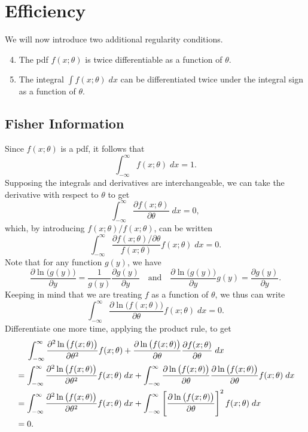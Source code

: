 \documentclass[12pt]{article}
\theoremstyle{definition}
\begin{document}
\section{Efficiency}

 We will now introduce two additional regularity conditions.
\begin{enumerate}[label=\textbf{(R\arabic*)}]
\setcounter{enumi}{3}
	\item The pdf $f(x;\theta)$ is twice differentiable as a function of $\theta$.
	\item The integral $\int f(x;\theta)\; dx$ can be differentiated twice under the integral sign as a function of $\theta$. 
\end{enumerate}
 



\subsection{Fisher Information}

Since $f(x;\theta)$ is a pdf, it follows that 
	\[	\int_{-\infty}^{\infty} f(x;\theta) \; dx = 1.	\]
Supposing the integrals and derivatives are interchangeable, we can take the derivative with respect to $\theta$ to get
	\[	\int_{-\infty}^{\infty} \frac{\partial f(x;\theta)}{\partial \theta} \; dx = 0,	\]
which, by introducing $f(x;\theta)/f(x;\theta)$, can be written 
	\[	\int_{-\infty}^{\infty} \frac{\partial f(x;\theta)/ \partial \theta}{f(x;\theta)}f(x;\theta) \; dx = 0.	\]
Note that for any function $g(y)$, we have
	\[\frac{\partial \ln\big( g(y)\big)}{\partial y} = \frac{1}{g(y)}\frac{\partial g(y)}{\partial y} \quad \text{and} \quad \frac{\partial \ln\big( g(y)\big)}{\partial y} g(y)=\frac{\partial g(y)}{\partial y}.	\]
Keeping in mind that we are treating $f$ as a function of $\theta$, we thus can write
\begin{equation}
	\int_{-\infty}^{\infty} \frac{\partial \ln\big( f(x;\theta)\big)}{\partial \theta }f(x;\theta) \; dx = 0.	\label{beforeexp1}
\end{equation}
Differentiate one more time, applying the product rule, to get 
\begin{align}
	&\hspace{.45cm} \int_{-\infty}^{\infty} \frac{\partial^2 \ln\big( f(x;\theta)\big)}{\partial \theta^2 }f(x;\theta) + \frac{\partial \ln\big( f(x;\theta)\big)}{\partial \theta }\frac{\partial f(x;\theta)}{ \partial \theta} \; dx \nonumber \\
	& = \int_{-\infty}^{\infty} \frac{\partial^2 \ln\big( f(x;\theta)\big)}{\partial \theta^2 }f(x;\theta) \;dx + \int_{-\infty}^{\infty}  \frac{\partial \ln\big( f(x;\theta)\big)}{\partial \theta } \frac{\partial \ln\big( f(x;\theta) \big)}{\partial \theta} f(x;\theta) \; dx \nonumber \\
	& = \int_{-\infty}^{\infty} \frac{\partial^2 \ln\big( f(x;\theta)\big)}{\partial \theta^2 }f(x;\theta) \;dx + \int_{-\infty}^{\infty}  \left [\frac{\partial \ln\big( f(x;\theta)\big)}{\partial \theta }\right]^2 f(x;\theta) \; dx  \label{beforeexpect} \\
	&= 0. 	\nonumber 
\end{align}
\end{document}
